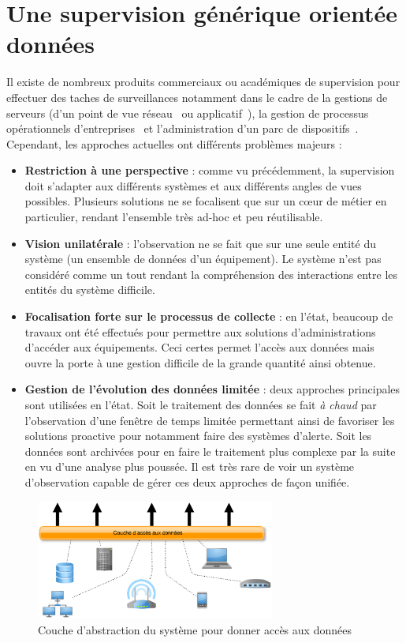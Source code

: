 \section{Une supervision générique orientée données}\label{sec:intro:objectif}
Il existe de nombreux produits commerciaux ou académiques de supervision pour effectuer des taches de surveillances notamment dans le cadre de la gestions de serveurs (d'un point de vue réseau~\cite{gestion équip réseau} ou applicatif~\cite{supervision apache}), la gestion de processus opérationnels d'entreprises~\cite{google:business process supervision} et l'administration d'un parc de dispositifs~\cite{snmp:voir thèse mehdi}. Cependant, les approches actuelles ont différents problèmes majeurs :
\begin{itemize}
    \item \textbf{Restriction à une perspective} : comme vu précédemment, la supervision doit s'adapter aux différents systèmes et aux différents angles de vues possibles. Plusieurs solutions ne se focalisent que sur un cœur de métier en particulier, rendant l'ensemble très ad-hoc et peu réutilisable.
    \item \textbf{Vision unilatérale} : l'observation ne se fait que sur une seule entité du système (un ensemble de données d'un équipement). Le système n'est pas considéré comme un tout rendant la compréhension des interactions entre les entités du système difficile.
    \item \textbf{Focalisation forte sur le processus de collecte} : en l'état, beaucoup de travaux ont été effectués pour permettre aux solutions d'administrations d'accéder aux équipements. Ceci certes permet l'accès aux données mais ouvre la porte à une gestion difficile de la grande quantité ainsi obtenue.
    \item \textbf{Gestion de l'évolution des données limitée} : deux approches principales sont utilisées en l'état. Soit le traitement des données se fait \textit{à chaud} par l'observation d'une fenêtre de temps limitée permettant ainsi de favoriser les solutions proactive pour notamment faire des systèmes d'alerte. Soit les données sont archivées pour en faire le traitement plus complexe par la suite en vu d'une analyse plus poussée. Il est très rare de voir un système d'observation capable de gérer ces deux approches de façon unifiée. 
\end{itemize}
\begin{figure}
\centering
\includegraphics[width=0.7\textwidth]{fig/intro-objectif.eps}
\caption{Couche d'abstraction du système pour donner accès aux données}\label{fig:intro:objectif:abstraction}
\end{figure}

